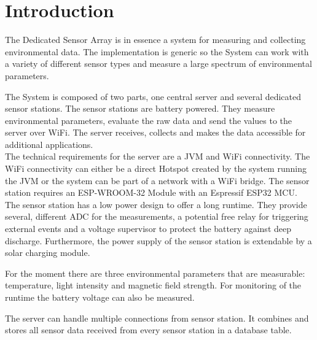 %
%
\newcommand{\TITLE}{
Dedicated Sensor Array
}
\newcommand{\VERSION}{
2
}







\section{Introduction}
\justify

The Dedicated Sensor Array is in essence a system for measuring and collecting environmental data. The implementation is generic so the System can work with a variety of different sensor types and measure a large spectrum of environmental parameters. 


The System is composed of two parts, one central server and several dedicated sensor stations. The sensor stations are battery powered. They measure environmental parameters, evaluate the raw data and send the values to the server over WiFi. The server receives, collects and makes the data accessible for additional applications. \\

The technical requirements for the server are a JVM and WiFi connectivity. The WiFi connectivity can either be a direct Hotspot created by the system running the JVM or the system can be part of a network with a WiFi bridge. The sensor station requires an ESP-WROOM-32 Module with an Espressif ESP32 MCU. \\

The sensor station has a low power design to offer a long runtime. They provide several, different ADC for the measurements, a potential free relay for triggering external events and a voltage supervisor to protect the battery against deep discharge. Furthermore, the power supply of the sensor station is extendable by a solar charging module.

For the moment there are three environmental parameters that are measurable: temperature, light intensity and magnetic field strength. For monitoring of the runtime the battery voltage can also be measured.

The server can handle multiple connections from sensor station. It combines and stores all sensor data received from every sensor station in a database table.\\


